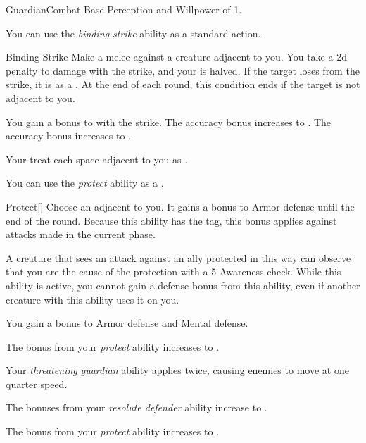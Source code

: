     \begin{feat}{Guardian}{Combat}
        \featpre Base Perception and Willpower of 1.

         You can use the \textit{binding strike} ability as a standard action.
        \begin{freeability}{Binding Strike}
            Make a melee  against a creature adjacent to you.
            You take a \minus2d penalty to damage with the strike, and your  is halved.
            If the target loses  from the strike, it is  as a .
                At the end of each round, this condition ends if the target is not adjacent to you.

            \rankline
             You gain a  bonus to  with the strike.
             The accuracy bonus increases to .
             The accuracy bonus increases to .
        \end{freeability}

         Your  treat each space adjacent to you as .

         You can use the \textit{protect} ability as a .
        \begin{freeability}{Protect}[]
            Choose an  adjacent to you.
            It gains a  bonus to Armor defense until the end of the round.
            Because this ability has the  tag, this bonus applies against attacks made in the current phase.

            A creature that sees an attack against an ally protected in this way can observe that you are the cause of the protection with a  5 Awareness check.
            While this ability is active, you cannot gain a defense bonus from this ability, even if another creature with this ability uses it on you.
        \end{freeability}

         You gain a  bonus to Armor defense and Mental defense.

         The bonus from your \textit{protect} ability increases to .

         Your \textit{threatening guardian} ability applies  twice, causing enemies to move at one quarter speed.

         The bonuses from your \textit{resolute defender} ability increase to .

         The bonus from your \textit{protect} ability increases to .
    \end{feat}

